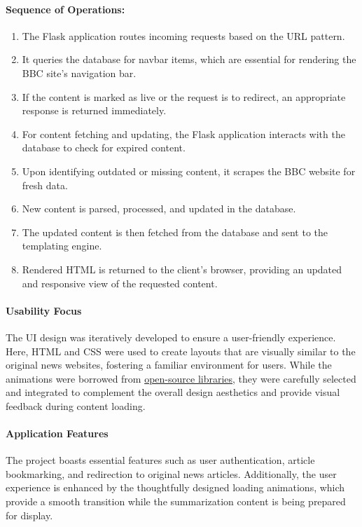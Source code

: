 \documentclass[10pt]{article}
\begin{document}
\paragraph{Sequence of Operations:}
\begin{enumerate}
    \item The Flask application routes incoming requests based on the URL pattern.
    \item It queries the database for navbar items, which are essential for rendering the BBC site's navigation bar.
    \item If the content is marked as live or the request is to redirect, an appropriate response is returned immediately.
    \item For content fetching and updating, the Flask application interacts with the database to check for expired content.
    \item Upon identifying outdated or missing content, it scrapes the BBC website for fresh data.
    \item New content is parsed, processed, and updated in the database.
    \item The updated content is then fetched from the database and sent to the templating engine.
    \item Rendered HTML is returned to the client's browser, providing an updated and responsive view of the requested content.
\end{enumerate}

\paragraph{Usability Focus}
The UI design was iteratively developed to ensure a user-friendly experience. Here, HTML and CSS were used to create layouts that are visually similar to the original news websites, fostering a familiar environment for users. While the animations were borrowed from \href{https://github.com/Lavender-z/demo/tree/master}{open-source libraries}, they were carefully selected and integrated to complement the overall design aesthetics and provide visual feedback during content loading.

\paragraph{Application Features}
The project boasts essential features such as user authentication, article bookmarking, and redirection to original news articles. Additionally, the user experience is enhanced by the thoughtfully designed loading animations, which provide a smooth transition while the summarization content is being prepared for display.
\end{document}
